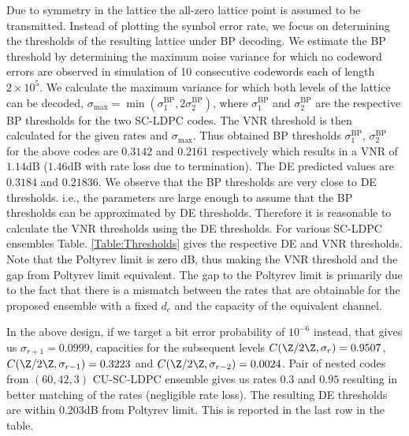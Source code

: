 \documentclass[journal]{IEEEtran}
\begin{document}
Due to symmetry in the lattice the all-zero lattice point is assumed to be transmitted. Instead of plotting the symbol error rate, we focus on determining the thresholds of the resulting lattice under BP decoding. We estimate the BP threshold by determining the maximum noise variance for which no codeword errors are observed in simulation of 10 consecutive codewords each of length $2\times 10^{5}$. We calculate the maximum variance for which both levels of the lattice can be decoded, $\sigma_{\text{max}}=\min(\sigma_{1}^{\text{BP}},2\sigma_{2}^{\text{BP}})$, where $\sigma_{1}^{\text{BP}}$ and $\sigma_{2}^{\text{BP}}$ are the respective BP thresholds for the two SC-LDPC codes. The VNR threshold is then calculated for the given rates and $\sigma_{\text{max}}$. Thus obtained BP thresholds $\sigma_{1}^{\text{BP}}$, $\sigma_{2}^{\text{BP}}$ for the above codes are $0.3142$ and $0.2161$ respectively which results in a VNR of $1.14$dB ($1.46$dB with rate loss due to termination). The DE predicted values are $0.3184$ and $0.21836$. We observe that the BP thresholds are very close to DE thresholds. i.e., the parameters are large enough to assume that the BP thresholds can be approximated by DE thresholds. Therefore it is reasonable to calculate the VNR thresholds using the DE thresholds. For various SC-LDPC ensembles Table. \ref{Table:Thresholds} gives the respective DE and VNR thresholds. Note that the Poltyrev limit is zero dB, thus making the VNR threshold and the gap from Poltyrev limit equivalent. The gap to the Poltyrev limit is primarily due to the fact that there is a mismatch between the rates that are obtainable for the proposed ensemble with a fixed $d_c$ and the capacity of the equivalent channel.
%

In the above design, if we target a bit error probability of $10^{-6}$ instead, that gives us $\sigma_{r+1}= 0.0999$, capacities for the subsequent levels $C(\Z/2\Z,\sigma_{r})=0.9507$, $C(\Z/2\Z,\sigma_{r-1})=0.3223$ and $C(\Z/2\Z,\sigma_{r-2})=0.0024$. Pair of nested codes from $(60,42,3)$ CU-SC-LDPC ensemble gives us rates $0.3$ and $0.95$ resulting in better matching of the rates (negligible rate loss). The resulting DE thresholds are within $0.203$dB from Poltyrev limit. This is reported in the last row in the table.
\end{document}
